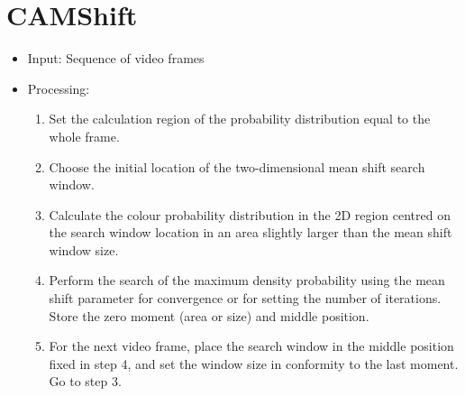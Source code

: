 \documentclass{scrreprt}
\begin{document}
\section{CAMShift}
\begin{itemize}
    \item Input: Sequence of video frames
    \item Processing:
    \begin{enumerate}
        \item Set the calculation region of the probability distribution equal to the whole frame.
        \item Choose the initial location of the two-dimensional mean shift search window.
        \item Calculate the colour probability distribution in the 2D region centred on the search window location in an area slightly larger than the mean shift window size.
        \item Perform the search of the maximum density probability using the mean shift parameter for convergence or for setting the number of iterations. Store the zero moment (area or size) and middle position.
        \item For the next video frame, place the search window in the middle position fixed in step 4, and set the window size in conformity to the last moment. Go to step 3. 
    \end{enumerate}
\end{itemize}
\begin{thebibliography}{999}

\bibitem{} 
\bibitem{}

\bibitem{} 

\bibitem{} 

\bibitem{} 

\bibitem{} 



\end{thebibliography}
\end{document}

